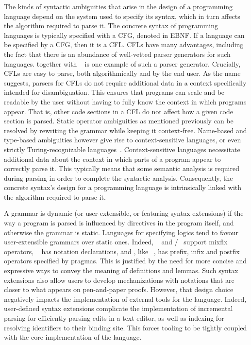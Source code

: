 
The kinds of syntactic ambiguities that arise in the design of a programming language depend on the system used to specify its syntax, which in turn affects the algorithm required to parse it.
The concrete syntax of programming languages is typically specified with a \ac{CFG}, denoted in \ac{EBNF}.
If a language can be specified by a \ac{CFG}, then it is a \ac{CFL}.
\Acp{CFL} have many advantages, including the fact that there is an abundance of well-vetted parser generators for such languages.
\ocamllex together with \ocamlyacc~\cite{smith2007ocamllex} is one example of such a parser generator.
Crucially, \acp{CFL} are easy to parse, both algorithmically and by the end user.
As the name suggests, parsers for \acp{CFL} do not require additional data in a context specifically intended for disambiguation.
This ensures that programs can scale and be readable by the user without having to fully know the context in which programs appear.
That is, other code sections in a \ac{CFL} do not affect how a given code section is parsed.
Static operator ambiguities as mentioned previously can be resolved by rewriting the grammar while keeping it context-free.
Name-based and type-based ambiguities however give rise to context-sensitive languages, or even strictly Turing-recognizable languages~\cite{chomsky1956three}.
Context-sensitive languages necessitate additional data about the context in which parts of a program appear to correctly parse it.
This typically means that some semantic analysis is required during parsing in order to complete the syntactic analysis.
Consequently, the concrete syntax's design for a programming language is intrinsically linked with the algorithm required to parse it.


A grammar is dynamic (or user-extensible, or featuring syntax extensions) if the way a program is parsed is influenced by directives in the program itself, and otherwise the grammar is static.
Languages for specifying logics tend to favour user-extensible grammars over static ones.
Indeed, \Agda~\cite{clffolp, agda2023} and \Isabelle/\HOL~\cite{wenzel2023isabelleimpl, wenzel2023isabellesys} support mixfix operators, \Coq~\cite{Coq} has notation declarations, and \Beluga, like \Twelf~\cite{Twelf}, has prefix, infix and postfix operators specified by pragmas.
This is justified by the need for more concise and expressive ways to convey the meaning of definitions and lemmas.
Such syntax extensions also allow users to develop mechanizations with notations that are closer to what appears on pen-and-paper proofs.
However, that design choice negatively impacts the implementation of external tools for the language.
Indeed, user-defined syntax extensions complicate the implementation of incremental parsing for efficiently parsing edits in a text editor, as well as indexing for resolving identifiers to their binding site.
This forces tooling to be tightly coupled with the core implementation of the language.

